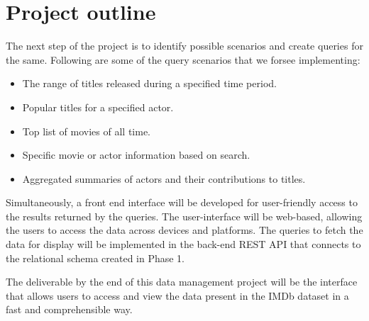 \documentclass{sig-alternate}
\begin{document}
	\section{Project outline}
	The next step of the project is to identify possible scenarios and create queries for the same. Following are some of the query scenarios that we forsee implementing:
        \begin{itemize}
            \item The range of titles released during a specified time period.
            \item Popular titles for a specified actor.
            \item Top list of movies of all time.
            \item Specific movie or actor information based on search.
           \item Aggregated summaries of actors and their contributions to titles.
        \end{itemize}

Simultaneously, a front end interface will be developed for user-friendly access to the results returned by the queries. The user-interface will be web-based, allowing the users to access the data across devices and platforms. The queries to fetch the data for display will be implemented in the back-end REST API that connects to the relational schema created in Phase 1.

The deliverable by the end of this data management project will be the interface that allows users to access and view the data present in the IMDb dataset in a fast and comprehensible way. 
\end{document}
